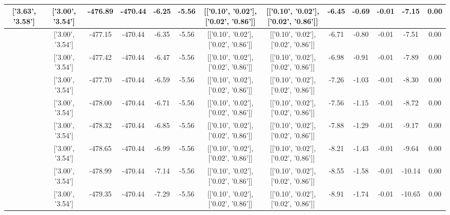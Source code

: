 \begin{table}[htbp]
\begin{adjustbox}{angle=90}
\begin{tabular}{|c|c|c|c|c|c|c|c|c|c|c|c|c|}
 ['3.63', '3.58'] & ['3.00', '3.54'] & -476.89 & -470.44 & -6.25 & -5.56 & [['0.10', '0.02'], ['0.02', '0.86']] & [['0.10', '0.02'], ['0.02', '0.86']] & -6.45 & -0.69 & -0.01 & -7.15 & 0.00\\ \hline
 ['3.67', '3.58'] & ['3.00', '3.54'] & -477.15 & -470.44 & -6.35 & -5.56 & [['0.10', '0.02'], ['0.02', '0.86']] & [['0.10', '0.02'], ['0.02', '0.86']] & -6.71 & -0.80 & -0.01 & -7.51 & 0.00\\ \hline
 ['3.71', '3.59'] & ['3.00', '3.54'] & -477.42 & -470.44 & -6.47 & -5.56 & [['0.10', '0.02'], ['0.02', '0.86']] & [['0.10', '0.02'], ['0.02', '0.86']] & -6.98 & -0.91 & -0.01 & -7.89 & 0.00\\ \hline
 ['3.74', '3.59'] & ['3.00', '3.54'] & -477.70 & -470.44 & -6.59 & -5.56 & [['0.10', '0.02'], ['0.02', '0.86']] & [['0.10', '0.02'], ['0.02', '0.86']] & -7.26 & -1.03 & -0.01 & -8.30 & 0.00\\ \hline
 ['3.78', '3.59'] & ['3.00', '3.54'] & -478.00 & -470.44 & -6.71 & -5.56 & [['0.10', '0.02'], ['0.02', '0.86']] & [['0.10', '0.02'], ['0.02', '0.86']] & -7.56 & -1.15 & -0.01 & -8.72 & 0.00\\ \hline
 ['3.82', '3.59'] & ['3.00', '3.54'] & -478.32 & -470.44 & -6.85 & -5.56 & [['0.10', '0.02'], ['0.02', '0.86']] & [['0.10', '0.02'], ['0.02', '0.86']] & -7.88 & -1.29 & -0.01 & -9.17 & 0.00\\ \hline
 ['3.86', '3.60'] & ['3.00', '3.54'] & -478.65 & -470.44 & -6.99 & -5.56 & [['0.10', '0.02'], ['0.02', '0.86']] & [['0.10', '0.02'], ['0.02', '0.86']] & -8.21 & -1.43 & -0.01 & -9.64 & 0.00\\ \hline
 ['3.90', '3.60'] & ['3.00', '3.54'] & -478.99 & -470.44 & -7.14 & -5.56 & [['0.10', '0.02'], ['0.02', '0.86']] & [['0.10', '0.02'], ['0.02', '0.86']] & -8.55 & -1.58 & -0.01 & -10.14 & 0.00\\ \hline
 ['3.93', '3.60'] & ['3.00', '3.54'] & -479.35 & -470.44 & -7.29 & -5.56 & [['0.10', '0.02'], ['0.02', '0.86']] & [['0.10', '0.02'], ['0.02', '0.86']] & -8.91 & -1.74 & -0.01 & -10.65 & 0.00\\ \hline
            \end{tabular}
        \end{adjustbox}
        \caption{}
        \label{}
    \end{table}
    
